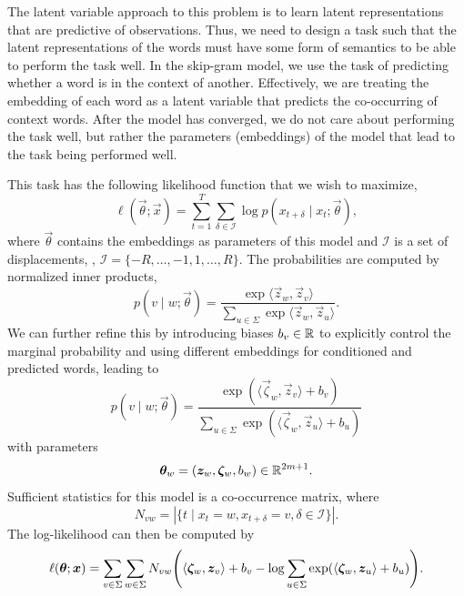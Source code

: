 The latent variable approach to this problem is to learn latent representations that are predictive
of observations. Thus, we need to design a task such that the latent representations of the words
must have some form of semantics to be able to perform the task well. In the skip-gram model, we
use the task of predicting whether a word is in the context of another. Effectively, we are treating the embedding of
each word as a latent variable that predicts the co-occurring of context words. After the model has
converged, we do not care about performing the task well, but rather the parameters (embeddings) of
the model that lead to the task being performed well.

This task has the following likelihood function that we wish to maximize, \[
    \ell(\vec{\theta}; \vec{x}) = \sum_{t=1}^{T} \sum_{\delta \in \mathcal{I}} \log p(x_{t+\delta} \mid x_t; \vec{\theta}),
\]
where $\vec{\theta}$ contains the embeddings as parameters of this model and $\mathcal{I}$ is a set
of displacements, \eg, $\mathcal{I} = \{ -R, \ldots, -1, 1, \ldots, R \}$. The probabilities are
computed by normalized inner products, \[
    p(v \mid w; \vec{\theta}) = \frac{\exp \langle \vec{z}_w, \vec{z}_v \rangle}{\sum_{u \in \Sigma} \exp \langle \vec{z}_w, \vec{z}_u \rangle}.
\]
We can further refine this by introducing biases $b_v \in \mathbb{R}$ to explicitly control the marginal
probability and using different embeddings for conditioned and predicted words, leading to \[
    p(v \mid w; \vec{\theta}) = \frac{\exp(\langle \vec{\zeta}_w, \vec{z}_v \rangle + b_v)}{\sum_{u \in \Sigma} \exp(\langle \vec{\zeta}_w, \vec{z}_u \rangle + b_u)}
\]
with parameters \[
    \bm{\theta}_w = (\bm{z}_w, \bm{\zeta}_w, b_w) \in \mathbb{R}^{2m+1}.
\]
Sufficient statistics for this model is a co-occurrence matrix, where \[
    N_{vw} = | \{ t \mid x_t = w, x_{t+\delta}=v, \delta \in \mathcal{I} \} |.
\]
The log-likelihood can then be computed by \[
    \ell(\vec{\theta}; \vec{x}) = \sum_{v \in \Sigma} \sum_{w \in \Sigma} N_{vw} \lft( \langle \vec{\zeta}_w, \vec{z}_v \rangle + b_v - \log \sum_{u \in \Sigma} \exp (\langle \vec{\zeta}_w, \vec{z}_u \rangle + b_u) \rgt).
\]

